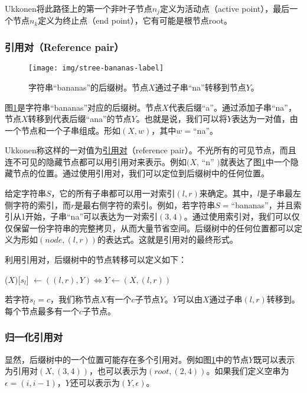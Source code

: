 \documentclass{ctexart}
\begin{document}
Ukkonen将此路径上的第一个非叶子节点$n_j$定义为活动点（active point），最后一个节点$n_k$定义为终止点（end point），它有可能是根节点root。

\subsubsection{引用对（Reference pair）}

\begin{figure}[htbp]
  \centering
  \texttt{[image: img/stree-bananas-label]}
  \caption{字符串“bananas”的后缀树。节点$X$通过子串“na”转移到节点$Y$。}
  \label{fig:stree-bananas-label}
\end{figure}

图\cref{fig:stree-bananas-label}是字符串“bananas”对应的后缀树。节点$X$代表后缀“a”。通过添加子串“na”，节点$X$转移到代表后缀“ana”的节点$Y$。也就是说，我们可以将$Y$表达为一对值，由一个节点和一个子串组成。形如$(X, w)$，其中$w=$“na”。

Ukkonen称这样的一对值为\underline{引用对}（reference pair）。不光所有的可见节点，而且连不可见的隐藏节点都可以用引用对来表示。例如$(X$, “n” $)$就表达了图\cref{fig:stree-bananas-label}中一个隐藏节点的位置。通过使用引用对，我们可以定位到后缀树中的任何位置。

给定字符串$S$，它的所有子串都可以用一对索引$(l, r)$来确定。其中，$l$是子串最左侧字符的索引，而$r$是最右侧字符的索引。例如，若字符串$S=$“bananas”，并且索引从1开始，子串“na”可以表达为一对索引$(3, 4)$。通过使用索引对，我们可以仅仅保留一份字符串的完整拷贝，从而大量节省空间。后缀树中的任何位置都可以定义为形如$(node, (l, r))$的表达式。这就是引用对的最终形式。

利用引用对，后缀树中的节点转移可以定义如下：

($X$)[$s_l$] $\gets ((l, r), Y) \iff Y \gets (X, (l, r))$

若字符$s_l=c$，我们称节点$X$有一个$c$子节点$Y$。$Y$可以由$X$通过子串$(l, r)$转移到。每个节点最多有一个$c$子节点。

\subsubsection{归一化引用对}

显然，后缀树中的一个位置可能存在多个引用对。例如图\cref{fig:stree-bananas-label}中的节点$Y$既可以表示为引用对$(X, (3, 4))$，也可以表示为$(root, (2, 4))$。如果我们定义空串为$\epsilon=(i, i-1)$，$Y$还可以表示为$(Y, \epsilon)$。
\end{document}
